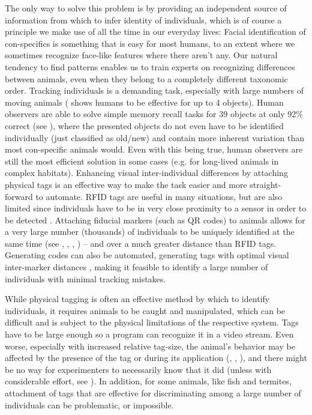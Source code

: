\documentclass[9pt,lineno]{elife}
\begin{document}
The only way to solve this problem is by providing an independent source of information from which to infer identity of individuals, which is of course a principle we make use of all the time in our everyday lives: Facial identification of con-specifics is something that {\color{blue}is easy for most humans}, to an extent where we sometimes recognize face-like features where there aren't any. Our natural tendency to find patterns enables us to train experts on recognizing differences between animals, even when they belong to a completely different taxonomic order. Tracking individuals is a demanding task, especially with large numbers of moving animals (\citealt{liu2009effect} shows humans to be effective for up to 4 objects). Human observers are able to solve simple memory recall tasks for 39 objects at only 92\% correct (see \citealt{humphrey1992recognizing}), where the presented objects do not even have to be identified individually (just classified as old/new) and contain more inherent variation than most con-specific animals would. Even with this being true, human observers are still the most efficient solution in some cases (e.g. for long-lived animals in complex habitats). Enhancing visual inter-individual differences by attaching physical tags is an effective way to make the task easier and more straight-forward to automate. RFID tags are useful in many situations, but are also limited since individuals have to be in very close proximity to a sensor in order to be detected \citep{bonter2011applications}. Attaching {\color{blue} fiducial markers (such as QR codes)} to animals allows for a very large number {\color{blue} (thousands) of individuals to be uniquely identified at the same time (see \citealt{Gernat1433}, \citealt{Wild2020.05.06.076943}, \citealt{mersch2013tracking}, \citealt{crall2015beetag}) -- and over a much greater distance than RFID tags.} Generating codes can also be automated, generating tags with optimal visual inter-marker distances \citep{garrido2016generation}, making it feasible to identify a large number of individuals with minimal tracking mistakes.

While physical tagging is often an effective method by which to identify individuals, it requires animals to be caught and manipulated, which can be difficult \citep{mersch2013tracking} and is subject to the physical limitations of the respective system. Tags have to be large enough so a program can recognize it in a video stream. Even worse, especially with increased relative tag-size, the animal's behavior may be affected by the presence of the tag {\color{blue}or during its application (\citealt{DENNIS20081939}, \citealt{pankiw2003effect}, \citealt{SOCKMAN2001205}),} and there might be no way for experimenters to necessarily know that it did {\color{blue}(unless with considerable effort, see \citealt{switzer2016bombus})}. In addition, for some animals, like fish and termites, attachment of tags that are effective for discriminating among a large number of individuals can be problematic, or impossible.
\end{document}

